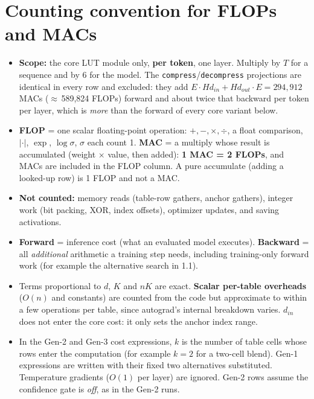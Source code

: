 \documentclass[10pt]{article}
\newcommand{\code}[1]{{\renewcommand{\_}{\textunderscore\allowbreak}\texttt{#1}}}
\begin{document}
\section*{Counting convention for FLOPs and MACs}
\begin{itemize}\setlength\itemsep{1pt}
\item \textbf{Scope:} the core LUT module only, \textbf{per token}, one layer. Multiply by $T$ for a sequence and by 6 for the
  model. The \code{compress}/\code{decompress} projections are identical in every row and excluded: they add
  $E\cdot Hd_{in}+Hd_{out}\cdot E=294{,}912$ MACs ($\approx$\,589,824 FLOPs) forward and about twice that backward per token per
  layer, which is \emph{more} than the forward of every core variant below.
\item \textbf{FLOP} = one scalar floating-point operation: $+,-,\times,\div$, a float comparison, $|\cdot|$, $\exp$, $\log\sigma$,
  $\sigma$ each count 1. \textbf{MAC} = a multiply whose result is accumulated (weight $\times$ value, then added):
  \textbf{1 MAC = 2 FLOPs}, and MACs are included in the FLOP column. A pure accumulate (adding a looked-up row) is 1 FLOP and not a MAC.
\item \textbf{Not counted:} memory reads (table-row gathers, anchor gathers), integer work (bit packing, XOR, index offsets),
  optimizer updates, and saving activations.
\item \textbf{Forward} = inference cost (what an evaluated model executes). \textbf{Backward} = all \emph{additional}
  arithmetic a training step needs, including training-only forward work (for example the alternative search in 1.1).
\item Terms proportional to $d$, $K$ and $nK$ are exact. \textbf{Scalar per-table overheads} ($O(n)$ and constants) are
  counted from the code but approximate to within a few operations per table, since autograd's internal breakdown varies.
  $d_{in}$ does not enter the core cost: it only sets the anchor index range.
\item In the Gen-2 and Gen-3 cost expressions, $k$ is the number of table cells whose rows enter the computation (for example $k=2$ for a two-cell blend).
  Gen-1 expressions are written with their fixed two alternatives substituted. Temperature gradients ($O(1)$ per layer) are ignored. Gen-2 rows assume the confidence gate is \emph{off}, as in the Gen-2 runs.
\end{itemize}
\end{document}
